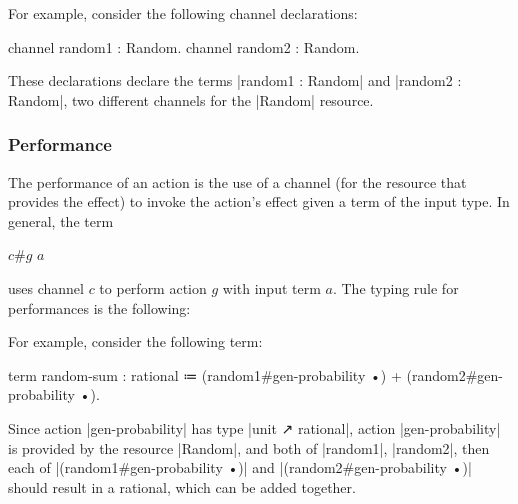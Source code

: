 \newparagraph
For example, consider the following channel declarations:
\begin{snippet}
channel random1 : Random.
channel random2 : Random.
\end{snippet}
These declarations declare the terms \code|random1 : Random| and \code|random2 : Random|, two different channels for the \code|Random| resource.

%

\subsubsection{Performance}

The performance of an action is the use of a channel (for the resource that provides the effect) to invoke the action's effect given a term of the input type.
In general, the term
\begin{snippet}
$c$#$g$ $a$
\end{snippet}
uses channel $c$ to perform action $g$ with input term $a$.
The typing rule for performances is the following:


\newparagraph
For example, consider the following term:
%
\begin{snippet}
term random-sum : rational
  ≔ (random1#gen-probability •) + (random2#gen-probability •).
\end{snippet}
%
Since action \code|gen-probability| has type \code|unit ↗ rational|,
action \code|gen-probability| is provided by the resource \code|Random|, and
both of \code|random1|, \code|random2|, then
each of \code|(random1#gen-probability •)| and \code|(random2#gen-probability •)| should result in a rational, which can be added together.


